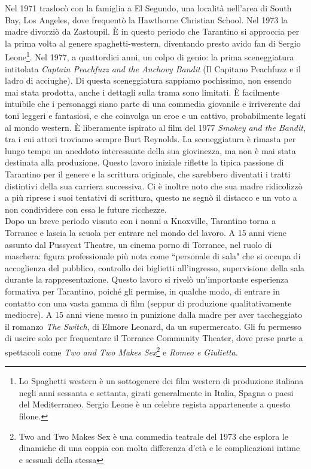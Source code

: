 \documentclass[12pt]{article} %
\begin{document}
\begin{flushleft}
    Nel 1971 traslocò con la famiglia a El Segundo, una località nell'area di South Bay, Los Angeles, dove frequentò la Hawthorne Christian School. Nel 1973 la madre divorziò da Zastoupil. 
    È in questo periodo che Tarantino si approccia per la prima volta al genere spaghetti-western, diventando presto avido fan di Sergio Leone\footnote{Lo Spaghetti western è un sottogenere dei film western di produzione italiana negli anni sessanta e settanta, girati generalmente in Italia, Spagna o paesi del Mediterraneo. Sergio Leone è un celebre regista appartenente a questo filone.}.
    Nel 1977, a quattordici anni, un colpo di genio: la prima sceneggiatura intitolata \textit{Captain Peachfuzz and the Anchovy Bandit }(Il Capitano Peachfuzz e il ladro di acciughe).
    Di questa sceneggiatura sappiamo pochissimo, non essendo mai stata prodotta, anche i dettagli sulla trama sono limitati. È facilmente intuibile che i personaggi siano parte di una commedia giovanile e irriverente dai toni leggeri e fantasiosi, e che coinvolga un eroe e un cattivo, probabilmente legati al mondo western. È liberamente ispirato al film del 1977 \textit{Smokey and the Bandit}, tra i cui attori troviamo sempre Burt Reynolds. 
    La sceneggiatura è rimasta per lungo tempo un aneddoto interessante della sua giovinezza, ma non è mai stata destinata alla produzione.
    Questo lavoro iniziale riflette la tipica passione di Tarantino per il genere e la scrittura originale, che sarebbero diventati i tratti distintivi della sua carriera successiva.
    Ci è inoltre noto che sua madre ridicolizzò a più riprese i suoi tentativi di scrittura, questo ne segnò il distacco e un voto a non condividere con essa le future ricchezze. \\\vspace{1cm}
    Dopo un breve periodo vissuto con i nonni a Knoxville, Tarantino torna a Torrance e lascia la scuola per entrare nel mondo del lavoro. 
    A 15 anni viene assunto dal Pussycat Theatre, un cinema porno di Torrance, nel ruolo di maschera: figura professionale più nota come ``personale di sala" che si occupa di accoglienza del pubblico, controllo dei biglietti all'ingresso, supervisione della sala durante la rappresentazione.
    Questo lavoro si rivelò un'importante esperienza formativa per Tarantino, poiché gli permise, in qualche modo, di entrare in contatto con una vasta gamma di film (seppur di produzione qualitativamente mediocre).
    A 15 anni viene messo in punizione dalla madre per aver taccheggiato il romanzo \textit{The Switch}, di Elmore Leonard, da un supermercato. Gli fu permesso di uscire solo per frequentare il Torrance Community Theater, dove prese parte a spettacoli come \textit{Two and Two Makes Sex}\footnote{Two and Two Makes Sex è una commedia teatrale del 1973 che esplora le dinamiche di una coppia con molta differenza d'età e le complicazioni intime e sessuali della stessa} e \textit{Romeo e Giulietta}.

\end{flushleft}
\end{document}
